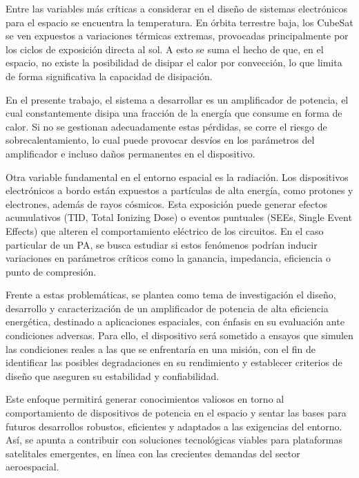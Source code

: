 Entre las variables más críticas a considerar en el diseño de sistemas electrónicos para el espacio se encuentra la temperatura. En órbita terrestre baja, los CubeSat se ven expuestos a variaciones térmicas extremas, provocadas principalmente por los ciclos de exposición directa al sol. A esto se suma el hecho de que, en el espacio, no existe la posibilidad de disipar el calor por convección, lo que limita de forma significativa la capacidad de disipación.

En el presente trabajo, el sistema a desarrollar es un amplificador de potencia, el cual constantemente disipa una fracción de la energía que consume en forma de calor. Si no se gestionan adecuadamente estas pérdidas, se corre el riesgo de sobrecalentamiento, lo cual puede provocar desvíos en los parámetros del amplificador e incluso daños permanentes en el dispositivo.

Otra variable fundamental en el entorno espacial es la radiación. Los dispositivos electrónicos a bordo están expuestos a partículas de alta energía, como protones y electrones, además de rayos cósmicos. Esta exposición puede generar efectos acumulativos (TID, Total Ionizing Dose) o eventos puntuales (SEEs, Single Event Effects) que alteren el comportamiento eléctrico de los circuitos. En el caso particular de un PA, se busca estudiar si estos fenómenos podrían inducir variaciones en parámetros críticos como la ganancia, impedancia, eficiencia o punto de compresión.

Frente a estas problemáticas, se plantea como tema de investigación el diseño, desarrollo y caracterización de un amplificador de potencia de alta eficiencia energética, destinado a aplicaciones espaciales, con énfasis en su evaluación ante condiciones adversas. Para ello, el dispositivo será sometido a ensayos que simulen las condiciones reales a las que se enfrentaría en una misión, con el fin de identificar las posibles degradaciones en su rendimiento y establecer criterios de diseño que aseguren su estabilidad y confiabilidad.

Este enfoque permitirá generar conocimientos valiosos en torno al comportamiento de dispositivos de potencia en el espacio y sentar las bases para futuros desarrollos robustos, eficientes y adaptados a las exigencias del entorno. Así, se apunta a contribuir con soluciones tecnológicas viables para plataformas satelitales emergentes, en línea con las crecientes demandas del sector aeroespacial.


